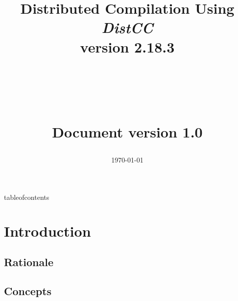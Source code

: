 \documentclass[a4paper]{book}
\begin{document}

\title
    {
    \begin{Huge}Distributed Compilation Using \textit{DistCC} \\ \vspace{.5 cm} version 2.18.3 \end{Huge}
    \\ \vspace{1 cm}
    \\ \vspace{2 cm}
    \begin{normalsize}Document version 1.0\end{normalsize}
    }
\date{\today}

%
\draftstring{}%
%
\watermark%
\maketitle%

\watermarkgraphic{}%
\watermark%
%
%


{tableofcontents}%
\tableofcontents%


\chapter{Introduction}

\section{Rationale}
\section{Concepts}
\end{document}
